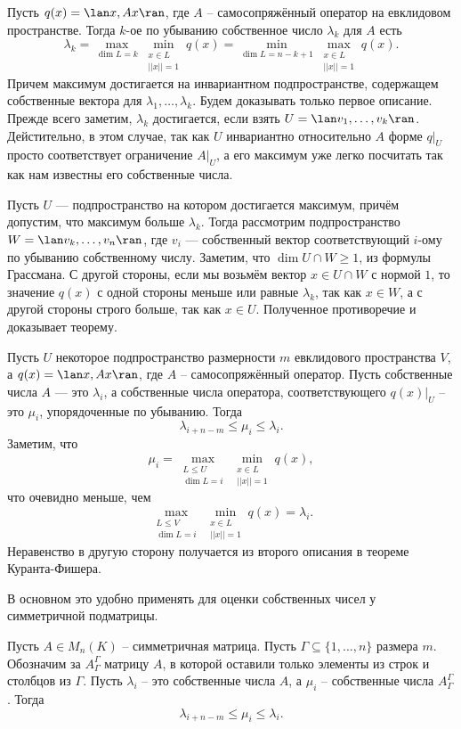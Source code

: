  Пусть $q(x)=\lan x, Ax\ran$, где $A$ -- самосопряжённый оператор на евклидовом пространстве. Тогда $k$-ое по убыванию собственное число $\lambda_k$ для $A$ есть 
$$\lambda_k=\max_{\dim L=k} \min_{\substack{ x\in L \\ ||x||=1}} q(x) = \min_{\dim L=n-k+1} \max_{\substack{ x\in L \\ ||x||=1}} q(x).$$
Причем максимум достигается на инвариантном подпространстве, содержащем собственные вектора для $\lambda_1,\dots,\lambda_k$.
\ethrm
\proof Будем доказывать только первое описание. Прежде всего заметим, $\lambda_k$ достигается, если взять $U=\lan v_1,\dots,v_k\ran$. Дейстительно, в этом случае, так как $U$ инвариантно относительно $A$ форме $q|_U$ просто соответствует ограничение $A|_U$, а его максимум уже легко посчитать так как нам известны его собственные числа.

Пусть $U$ --- подпространство на котором достигается максимум, причём допустим, что максимум больше $\lambda_k$. Тогда рассмотрим подпространство $W=\lan v_k,\dots,v_n\ran$, где $v_i$ --- собственный вектор соответствующий $i$-ому по убыванию собственному числу. Заметим, что $\dim U\cap W\geq 1$, из формулы Грассмана. С другой стороны, если мы возьмём вектор $x\in U \cap W$ с нормой $1$, то значение $q(x)$ с одной стороны меньше или равные $\lambda_k$, так как $x\in W$, а с другой стороны строго больше, так как $x\in U$. Полученное противоречие и доказывает теорему.  
\endproof




\crl Пусть $U$ некоторое подпространство размерности $m$ евклидового пространства $V$, а $q(x)=\lan x, Ax\ran$, где $A$ -- самосопряжённый оператор. Пусть собственные числа $A$ --- это $\lambda_i$, а собственные числа оператора, соответствующего $q(x)|_U$ -- это $\mu_i$, упорядоченные по убыванию. Тогда 
$$\lambda_{i+n-m}\leq \mu_i\leq \lambda_i.$$  
\proof Заметим, что
$$\mu_i=\max_{\substack{L\leq U\\ \dim L=i}} \min_{\substack{ x\in L \\ ||x||=1}} q(x),$$
что очевидно меньше, чем 
$$\max_{\substack{L\leq V\\ \dim L=i}} \min_{\substack{ x\in L \\ ||x||=1}} q(x)=\lambda_i.$$
Неравенство в другую сторону получается из второго описания в теореме Куранта-Фишера.
\endproof
\ecrl

В основном это удобно применять для оценки собственных чисел у симметричной подматрицы.

\crl Пусть $A\in M_n(K)$ -- симметричная матрица. Пусть $\Gamma \subseteq \{1,\dots, n\}$ размера $m$. Обозначим за $A^{\Gamma}_{\Gamma}$ матрицу $A$, в которой оставили только элементы из строк и столбцов из $\Gamma$. Пусть $\lambda_i$ -- это собственные числа $A$, а $\mu_i$ -- собственные числа $A^{\Gamma}_{\Gamma}$. Тогда
$$\lambda_{i+n-m}\leq \mu_i\leq \lambda_i.$$
\ecrl 



